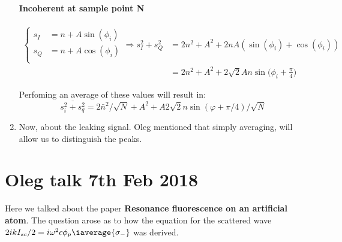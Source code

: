 \begin{enumerate}
 	\paragraph{Incoherent at sample point N}
 	\[
 	\begin{aligned}\left\lbrace\begin{aligned}
 	s_I &= n + A\sin(\phi_i)\\
 	s_Q &= n + A\cos(\phi_i)\\
 	\end{aligned}\right.\Rightarrow
 	{s_I^2+s_Q^2} &= 2n^2 + A^2 + 2nA(\sin(\phi_i)+\cos(\phi_i))\\
 	& = 2n^2 + A^2 +2\sqrt{2}An\sin\big(\phi_i + \frac{\pi}{4}\big)
 	\end{aligned}
 	\]
 	
 	Perfoming an average of these values will result in:
 	\[
 		\overline{s_i^2 + s_q^2} = 2\bar{n}^2/\sqrt{N} + A^2 + A2\sqrt{2}n\sin(\varphi + \pi/4)/\sqrt{N}
 	\]
 	
 	\item Now, about the leaking signal. Oleg mentioned that simply averaging, will allow us to distinguish the peaks.
 \end{enumerate}

\newpage
\section{Oleg talk 7th Feb 2018}
 Here we talked about the paper \textbf{Resonance fluorescence on an artificial atom}. The question arose as to how the equation for the scattered wave $ 2ikI_{sc}/2 = i\omega^2c\phi_p\iaverage{\sigma_{-}}$ was derived.
 
